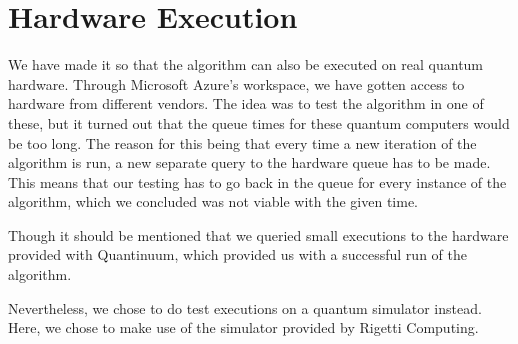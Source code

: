 \section{Hardware Execution}\label{sec:hardware-execution}
We have made it so that the algorithm can also be executed on real quantum hardware.
Through Microsoft Azure's workspace, we have gotten access to hardware from different vendors.
The idea was to test the algorithm in one of these, but it turned out that the queue times for these quantum computers would be too long.
The reason for this being that every time a new iteration of the algorithm is run, a new separate query to the hardware queue has to be made.
This means that our testing has to go back in the queue for every instance of the algorithm, which we concluded was not viable with the given time.

Though it should be mentioned that we queried small executions to the hardware provided with Quantinuum, which provided us with a successful run of the algorithm.


Nevertheless, we chose to do test executions on a quantum simulator instead.
Here, we chose to make use of the simulator provided by Rigetti Computing.